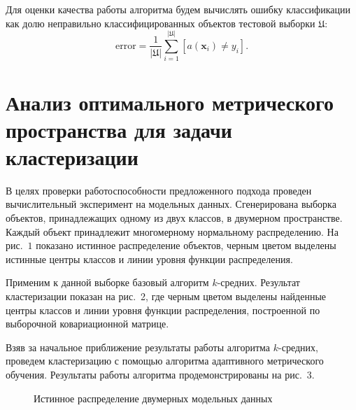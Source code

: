 Для оценки качества работы алгоритма будем вычислять ошибку классификации как долю неправильно классифицированных объектов тестовой выборки $\mathfrak{U}$:
\[
\text{error} = \frac1{|\mathfrak{U}|} \sum_{i = 1} ^ {|\mathfrak{U}|} [a(\mathbf{x}_i) \ne y_i].
\]


\section{Анализ оптимального метрического пространства для задачи кластеризации}
В целях проверки работоспособности предложенного подхода проведен вычислительный эксперимент на модельных данных. Сгенерирована выборка объектов, принадлежащих одному из двух классов, в двумерном пространстве.
Каждый объект принадлежит многомерному нормальному распределению.
На рис.~$1$ показано истинное распределение объектов, черным цветом выделены истинные центры классов и линии уровня функции распределения.


Применим к данной выборке базовый алгоритм $k$-средних.
Результат кластеризации показан на рис.~2, где черным цветом выделены найденные центры классов и линии уровня функции распределения, построенной по выборочной ковариационной матрице.

Взяв за начальное приближение результаты работы алгоритма $k$-средних,
проведем клас\-те\-ри\-за\-цию с помощью алгоритма адаптивного метрического обучения.
Результаты работы алгоритма продемонстрированы на рис.~$3$.
\begin{figure}[ht]
    \caption{Истинное распределение двумерных модельных данных}
\end{figure}

